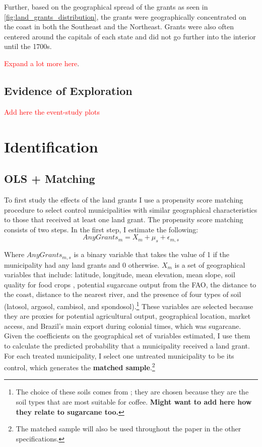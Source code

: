\documentclass[11pt]{article}
\newcommand{\red}[1]{\textcolor{red}{#1}}
\begin{document}
Further, based on the geographical spread of the grants as seen in \autoref{fig:land_grants_distribution}, the grants were geographically concentrated on the coast in both the Southeast and the Northeast. 
Grants were also often centered around the capitals of each state and did not go further into the interior until the 1700s.

\red{Expand a lot more here}.

\subsection{Evidence of Exploration}

\red{Add here the event-study plots}

\section{Identification}
\label{sec:identification}

\subsection{OLS + Matching}
\label{sec:ols}

To first study the effects of the land grants I use a propensity score matching procedure to select control municipalities with similar geographical characteristics to those that received at least one land grant. 
The propensity score matching consists of two steps.
In the first step, I estimate the following:
\begin{equation}
  AnyGrants_m = X_{m} + \mu_s + \epsilon_{m,s}
\end{equation}

Where $AnyGrants_{m,s}$ is a binary variable that takes the value of 1 if the municipality had any land grants and 0 otherwise.
$X_m$ is a set of geographical variables that include: latitude, longitude, mean elevation, mean slope, soil quality for food crops \parencite{Galor2016-ba}, potential sugarcane output from the FAO, the distance to the coast, distance to the nearest river, and the presence of four types of soil (latosol, argosol, cambisol, and spondosol).\footnote{The choice of these soils comes from \textcite{Rocha2017-yq}; they are chosen because they are the soil types that are most suitable for coffee. \textbf{Might want to add here how they relate to sugarcane too.}}
These variables are selected because they are proxies for potential agricultural output, geographical location, market access, and Brazil's main export during colonial times, which was sugarcane. 
Given the coefficients on the geographical set of variables estimated, I use them to calculate the predicted probability that a municipality received a land grant. 
For each treated municipality, I select one untreated municipality to be its control, which generates the \textbf{matched sample}.\footnote{The matched sample will also be used throughout the paper in the other specifications.}
\end{document}
